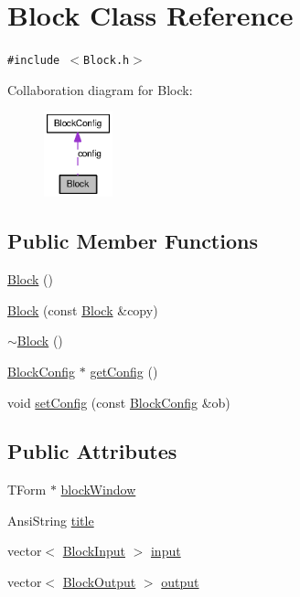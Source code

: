 \hypertarget{classBlock}{
\section{Block Class Reference}
\label{classBlock}
}
{\tt \#include $<$Block.h$>$}

Collaboration diagram for Block:\nopagebreak
\begin{figure}[H]
\begin{center}
\leavevmode
\includegraphics[width=56pt]{classBlock__coll__graph}
\end{center}
\end{figure}
\subsection*{Public Member Functions}
\begin{CompactItemize}
\item 
\hyperlink{classBlock_37658a946bf5067ad01d68d9ff086adc}{Block} ()
\item 
\hyperlink{classBlock_eaf94aa618003b452d8b6f32d1e23766}{Block} (const \hyperlink{classBlock}{Block} \&copy)
\item 
\hyperlink{classBlock_19d1bd0e1cef6a865ed2745a2e648405}{$\sim$Block} ()
\item 
\hyperlink{classBlockConfig}{BlockConfig} $\ast$ \hyperlink{classBlock_17985f527bea557c7da9279424d96ccc}{getConfig} ()
\item 
void \hyperlink{classBlock_703019dc511468104b327bff7dd779d2}{setConfig} (const \hyperlink{classBlockConfig}{BlockConfig} \&ob)
\end{CompactItemize}
\subsection*{Public Attributes}
\begin{CompactItemize}
\item 
TForm $\ast$ \hyperlink{classBlock_64bbe660cd95004706c7f5158d8e270b}{blockWindow}
\item 
AnsiString \hyperlink{classBlock_9c89fafbe64236bc46ade38d458712b1}{title}
\item 
vector$<$ \hyperlink{classBlockInput}{BlockInput} $>$ \hyperlink{classBlock_6a6c2c1e8c3fd4219d8cc7e9f099205b}{input}
\item 
vector$<$ \hyperlink{classBlockOutput}{BlockOutput} $>$ \hyperlink{classBlock_7afddb4a8f6063e0b05dbdd1f17cf07f}{output}
\end{CompactItemize}
